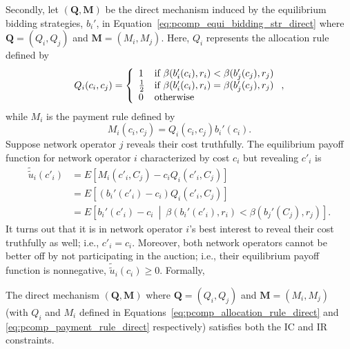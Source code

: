 Secondly, let $(\mathbf{Q},\mathbf{M})$ be the direct mechanism induced by the equilibrium bidding strategies, $b_i'$, in Equation~\eqref{eq:pcomp_equi_bidding_str_direct} where $\mathbf{Q}=(Q_i,Q_j)$ and $\mathbf{M}=(M_i,M_j)$. Here, $Q_i$ represents the allocation rule defined by
\begin{equation}
	\label{eq:pcomp_allocation_rule_direct}
	Q_i(c_i,c_j) =
	\left\{
	\begin{array}{l l}
		1 &\text{if } \beta(b_i'(c_i),r_i) < \beta(b_j'(c_j),r_j)\\
		\frac{1}{2} &\text{if } \beta(b_i'(c_i),r_i) = \beta(b_j'(c_j),r_j)\\
		0 &\text{otherwise}
	\end{array}
	\right.,
\end{equation}
while $M_i$ is the payment rule defined by
\begin{equation}
	\label{eq:pcomp_payment_rule_direct}
	M_i(c_i,c_j) = Q_i(c_i,c_j)b_i'(c_i).
\end{equation}
Suppose network operator $j$ reveals their cost truthfully. The equilibrium payoff function for network operator $i$ characterized by cost $c_i$ but revealing $c'_i$ is
\begin{align}
	\tilde{\tilde{u}}_i(c'_i) &= E\left[ M_i(c'_i,C_j) - c_iQ_i(c'_i,C_j) \right]\nonumber \\
	&= E\left[ (b_i'(c'_i)-c_i)Q_i(c'_i,C_j) \right]\nonumber \\
	&= E\left[ b_i'(c'_i)-c_i \:\middle\vert\: \beta(b_i'(c'_i),r_i) < \beta(b_j'(C_j),r_j) \right].
	\label{eq:pcomp_expected_utility_direct}
\end{align}
It turns out that it is in network operator $i$'s best interest to reveal their cost truthfully as well; i.e., $c'_i=c_i$. Moreover, both network operators cannot be better off by not participating in the auction; i.e., their equilibrium payoff function is nonnegative, $\tilde{\tilde{u}}_i(c_i)\ge 0$. Formally,
\begin{proposition}
\label{prop:pcomp_direct_mechanism_direct}
The direct mechanism $(\mathbf{Q},\mathbf{M})$ where $\mathbf{Q}=(Q_i,Q_j)$ and $\mathbf{M}=(M_i,M_j)$ (with $Q_i$ and $M_i$ defined in Equations~\eqref{eq:pcomp_allocation_rule_direct} and \eqref{eq:pcomp_payment_rule_direct} respectively) satisfies both the IC and IR constraints.
\end{proposition}

